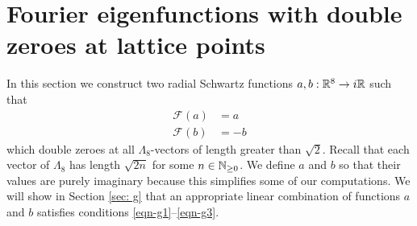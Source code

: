\section{Fourier eigenfunctions with double zeroes at lattice points}\label{sec: fourier double zeroes}
In this section we construct two radial Schwartz functions $a,b:\mathbb{R}^8\to i\mathbb{R}$ such that
\begin{align}\mathcal{F}(a)&=a\label{eqn: a fourier}\\
  \mathcal{F}(b)&=-b\label{eqn: b fourier}
\end{align}
which double zeroes at all $\Lambda_8$-vectors of length greater than $\sqrt{2}$. Recall that each vector of $\Lambda_8$ has length $\sqrt{2n}$ for some $n\in\mathbb{N}_{\geq 0}$. We define $a$ and $b$ so that their values are purely imaginary because this simplifies some of our computations. We will show in Section \ref{sec: g} that an appropriate linear combination of functions $a$ and $b$ satisfies conditions \eqref{eqn-g1}--\eqref{eqn-g3}.

